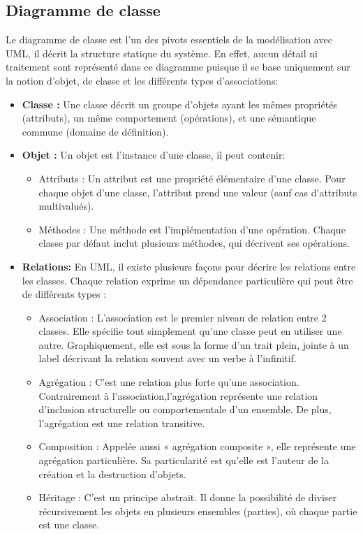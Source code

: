 \subsection{Diagramme de classe}
Le diagramme de classe est l'un des pivots essentiels de la modélisation avec UML, il décrit la structure statique du système. En effet, aucun détail ni traitement sont représenté dans ce diagramme puisque il 
se base uniquement sur la notion d'objet, de classe et les différents types d'associations:
\begin{itemize}
	\item \textbf{Classe :} 
    Une classe décrit un groupe d'objets ayant les mêmes propriétés (attributs), un même comportement (opérations), et une sémantique commune (domaine de définition).
	\item \textbf{Objet :} Un objet est l'instance d'une classe, il peut contenir:
        \begin{itemize}
    	\item Attributs : Un attribut est une propriété élémentaire d'une classe. Pour chaque objet d'une classe, l'attribut prend une valeur (sauf cas d'attributs multivalués).
    	\item Méthodes : Une méthode est l'implémentation d'une opération. Chaque classe par défaut inclut plusieurs méthodes, qui décrivent ses opérations.
       \end{itemize}
	\item \textbf{Relations:}
	En UML, il existe plusieurs façons pour décrire les relations entre les classes. Chaque relation exprime un dépendance particulière qui peut être de différents types \cite{UML}:
    	\begin{itemize}
    	\item Association : L'association est le premier niveau de relation entre 2 classes. Elle spécifie tout simplement qu'une classe peut en utiliser une autre. Graphiquement, elle est sous la forme d'un trait plein, jointe à un label décrivant la relation souvent avec un verbe à l'infinitif.
    	\item Agrégation : C'est une relation plus forte qu'une association. Contrairement à l'association,l'agrégation représente une relation d'inclusion structurelle ou comportementale d'un ensemble. De plus, l'agrégation est une relation transitive.
    	\item Composition : Appelée aussi « agrégation composite », elle représente une agrégation particulière. Sa particularité est qu'elle est l'auteur de la création et la destruction d'objets.
    	\item Héritage : C'est un principe abstrait. Il donne la possibilité de diviser récursivement les objets en plusieurs ensembles (parties), où chaque partie est une classe.
       \end{itemize}
\end{itemize}

